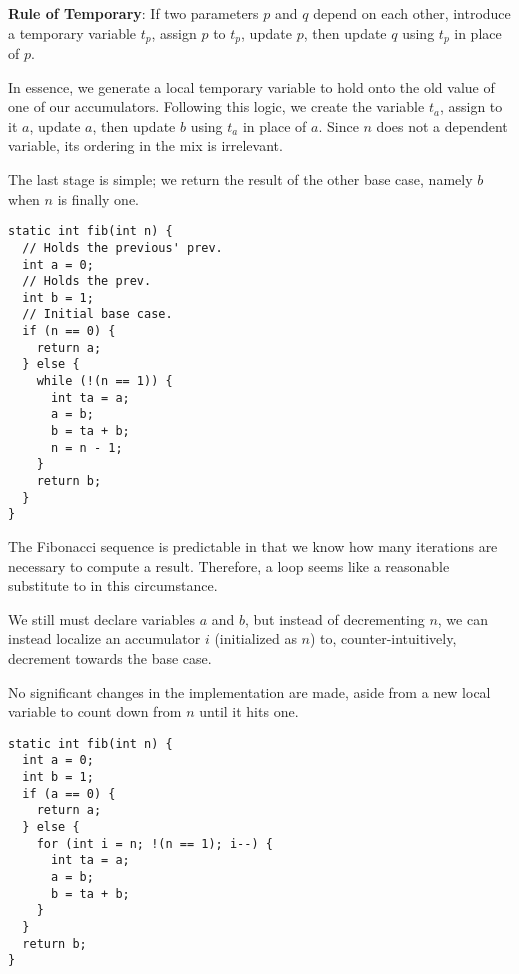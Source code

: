 \textbf{Rule of Temporary}: If two parameters $p$ and $q$ depend on each other, introduce a temporary variable $t_p$, assign $p$ to $t_p$, update $p$, then update $q$ using $t_p$ in place of $p$.

In essence, we generate a local temporary variable to hold onto the old value of one of our accumulators. Following this logic, we create the variable $t_a$, assign to it $a$, update $a$, then update $b$ using $t_a$ in place of $a$. Since $n$ does not a dependent variable, its ordering in the mix is irrelevant.

The last stage is simple; we return the result of the other base case, namely $b$ when $n$ is finally one.

\begin{lstlisting}[language=MyJava]
static int fib(int n) {
  // Holds the previous' prev.
  int a = 0;
  // Holds the prev.
  int b = 1;
  // Initial base case.
  if (n == 0) {
    return a;
  } else {
    while (!(n == 1)) {
      int ta = a;
      a = b;
      b = ta + b;
      n = n - 1;
    }
    return b;
  }
}
\end{lstlisting}

The Fibonacci sequence is predictable in that we know how many iterations are necessary to compute a result. Therefore, a  loop seems like a reasonable substitute to  in this circumstance. 

We still must declare variables $a$ and $b$, but instead of decrementing $n$, we can instead localize an accumulator $i$ (initialized as $n$) to, counter-intuitively, decrement towards the base case. 

No significant changes in the implementation are made, aside from a new local variable to count down from $n$ until it hits one.

\begin{lstlisting}[language=MyJava]
static int fib(int n) {
  int a = 0;
  int b = 1;
  if (a == 0) {
    return a;
  } else {
    for (int i = n; !(n == 1); i--) {
      int ta = a;
      a = b;
      b = ta + b;
    }
  }
  return b;
}
\end{lstlisting}


